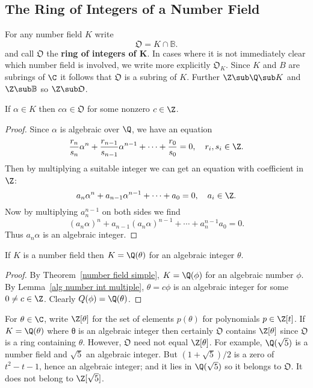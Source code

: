 \subsection{The Ring of Integers of a Number Field}
For any number field $K$ write
\[\mathfrak{O}=K\cap\mathbb{B}.\]
and call $\mathfrak{O}$ the \textbf{ring of integers of $\bm{K}$}. In cases where it is not immediately clear which number field is involved, we write more explicitly $\mathfrak{O}_K$. Since $K$ and $B$ are subrings of $\C$ it follows that $\mathfrak{O}$ is a subring of $K$. Further $\Z\sub\Q\sub K$ and $\Z\sub\mathbb{B}$ so $\Z\sub\mathfrak{O}$.
\begin{lemma}\label{alg number int multiple}
If $\alpha\in K$ then $c\alpha\in\mathfrak{O}$ for some nonzero $c\in\Z$.
\end{lemma}
\begin{proof}
Since $\alpha$ is algebraic over $\Q$, we have an equation
\[\frac{r_n}{s_n}\alpha^n+\frac{r_{n-1}}{s_{n-1}}\alpha^{n-1}+\cdots+\frac{r_0}{s_0}=0,\quad r_i,s_i\in\Z.\]
Then by multiplying a suitable integer we can get an equation with coefficient in $\Z$:
\[a_n\alpha^n+a_{n-1}\alpha^{n-1}+\cdots+a_0=0,\quad a_i\in\Z.\]
Now by multiplying $a_n^{n-1}$ on both sides we find
\[(a_n\alpha)^n+a_{n-1}(a_n\alpha)^{n-1}+\cdots+a_{n}^{n-1}a_0=0.\]
Thus $a_n\alpha$ is an algebraic integer.
\end{proof}
\begin{corollary}
If $K$ is a number field then $K=\Q(\theta)$ for an algebraic integer $\theta$.
\end{corollary}
\begin{proof}
By Theorem~\ref{number field simple}, $K=\Q(\phi)$ for an algebraic number $\phi$. By Lemma~\ref{alg number int multiple}, $\theta=c\phi$ is an algebraic integer for some $0\neq c\in\Z$. Clearly $Q(\phi)=\Q(\theta)$.
\end{proof}
\begin{remark}
For $\theta\in\C$, write $\Z[\theta]$ for the set of elements $p(\theta)$ for polynomials $p\in\Z[t]$. If $K=\Q(\theta)$ where θ is an algebraic integer then certainly $\mathfrak{O}$ contains $\Z[\theta]$ since $\mathfrak{O}$ is a ring containing $\theta$. However, $\mathfrak{O}$ need not equal $\Z[\theta]$. For example, $\Q(\sqrt{5})$ is a number field and $\sqrt{5}$ an algebraic integer. But $(1+\sqrt{5})/2$ is a zero of $t^2-t-1$, hence an algebraic integer; and it lies in $\Q(\sqrt{5})$ so it belongs to $\mathfrak{O}$. It does not belong to $\Z[\sqrt{5}]$.
\end{remark}
